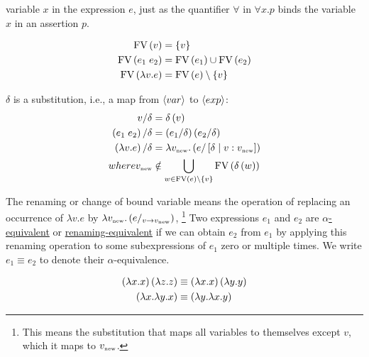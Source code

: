 \begin{enumcirc}
	variable $x$ in the expression $e$, just as the quantifier $\forall$ in
	$\forall x. p$ binds the variable $x$ in an assertion $p$.
	\begin{enumrm}
		\item
		\begin{align*}
			\textrm{FV}\left(  v  \right)            & = \left\{ v \right\}                  \\
			\textrm{FV}\left(  e_1 \; e_2  \right)   & = \textrm{FV}\left(  e_1  \right) \cup \textrm{FV}\left(  e_2  \right)      \\
			\textrm{FV}\left(  \lambda v. e  \right) & = \textrm{FV}\left(  e  \right) \setminus \left\{ v \right\} \\
		\end{align*}
		\item
		$\delta$ is a substitution, i.e., a map from $\left\langle var \right\rangle$ to $\left\langle exp \right\rangle$:
		\begin{align*}
			v / \delta                    & = \delta\left( v \right)                                                             \\
			\left( e_1 \; e_2 \right) / \delta   & = \left( e_1 / \delta \right) \left( e_2 / \delta \right)                                   \\
			\left( \lambda v. e \right) / \delta & = \lambda v_{\textrm{\tiny new}}. \left( e / \left[ \delta \; \middle\vert \; v: v_{\textrm{\tiny new}} \right] \right) \\
			where v_{\textrm{\tiny new}}      & \notin \bigcup_{w \in \textrm{FV}\left(  e  \right) \setminus \left\{ v \right\}} \textrm{FV}\left(  \delta\left( w \right)  \right)
		\end{align*}
		\item
		The renaming or change of bound variable means the operation of replacing an
		occurrence of $\lambda v. e$ by
		$\lambda v_{\textrm{\tiny new}}. \left( e/_{v \rightarrow v_{\textrm{\tiny new}}} \right)$,
		\footnote{
			This means the substitution that maps all variables to themselves except $v$, which
			it maps to $v_{\textrm{\tiny new}}$.
		}
		Two expressions $e_1$ and $e_2$ are \ul{$\alpha$-equivalent} or
		\ul{renaming-equivalent} if we can obtain $e_2$ from $e_1$ by applying this
		renaming operation to some subexpressions of $e_1$ zero or multiple times.
		We write $e_1 \equiv e_2$ to denote their $\alpha$-equivalence.
		\begin{example}
			\begin{align*}
				\left( \lambda x. x \right) \left( \lambda z. z \right) & \equiv
				\left( \lambda x. x \right) \left( \lambda y. y \right)          \\
				\left( \lambda x. \lambda y. x \right)           & \equiv
				\left( \lambda y. \lambda x. y \right)                    \\
			\end{align*}
		\end{example}
	\end{enumrm}
\end{enumcirc}

